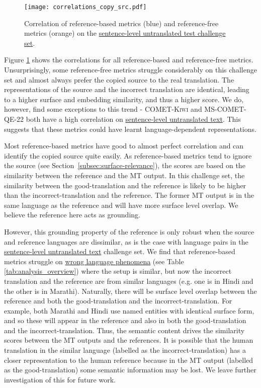 \documentclass[11pt]{article}
\begin{document}
\begin{figure}
    \centering
    \texttt{[image: correlations\_copy\_src.pdf]}
    \caption{Correlation of reference-based metrics (blue) and reference-free metrics (orange) on the  \hyperref[subsec:sent-untranslated]{sentence-level untranslated test challenge set}.}
   \label{fig:corr_copy_src}
\end{figure}

Figure \ref{fig:corr_copy_src} shows the correlations for all reference-based and reference-free metrics. Unsurprisingly, some 
reference-free metrics struggle considerably on this challenge set and almost always prefer the copied source to the real translation. The representations of the source and the incorrect translation are identical, leading to a higher surface and embedding similarity, and thus a higher score. We do, however, find some exceptions to this trend - \textsc{COMET-Kiwi} and \textsc{MS-COMET-QE-22} both have a high correlation on  \hyperref[subsec:sent-untranslated]{sentence-level untranslated text}. This suggests that these metrics could have learnt language-dependent representations. 

Most reference-based metrics have good to almost perfect correlation and can identify the copied source quite easily. As reference-based metrics tend to ignore the source (see Section~\ref{subsec:surface-relevance}), the scores are based on the similarity between the reference and the MT output. In this challenge set, the similarity between the good-translation and the reference is likely to be higher than the incorrect-translation and the reference. The former MT output is in the same language as the reference and will have more surface level overlap. We believe the reference here acts as grounding.

However, this grounding property of the reference is only robust when the source and reference languages are dissimilar, as is the case with language pairs in the \hyperref[subsec:sent-untranslated]{sentence-level untranslated text} challenge set. We find that reference-based metrics struggle on \hyperref[sec:wrong_language]{wrong language phenomena}  (see Table \ref{tab:analysis_overview}) where the setup is similar, but now the incorrect translation and the reference are from similar languages (e.g. one is in Hindi and the other is in Marathi). Naturally, there will be surface level overlap between the reference and both the good-translation and the incorrect-translation. For example, both Marathi and Hindi use named entities with identical surface form, and so these will appear in the reference and also in both the good-translation and the incorrect-translation. Thus, the semantic content drives the similarity scores between the MT outputs and the references. It is possible that the human translation in the similar language (labelled as the incorrect-translation) has a closer representation to the human reference because in the MT output (labelled as the good-translation) some semantic information may be lost. We leave further investigation of this for future work.
\end{document}
